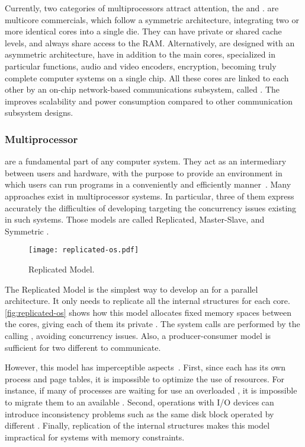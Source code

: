 			Currently, two categories of multiprocessors attract attention, the \cmp and \mpsoc.
			\cmps are multicore commercials, which follow a symmetric architecture,
			integrating two or more identical cores into a single die.
			They can have private or shared cache levels, and always share access
			to the RAM.
			Alternatively, \mpsocs are designed with an asymmetric architecture,
			have in addition to the main cores, specialized \cpus in particular
			functions, \eg audio and video encoders, encryption, becoming truly
			complete computer systems on a single chip.
			All these cores are linked to each other by an on-chip network-based
			communications subsystem, called \noc.
			The \noc improves scalability and power consumption compared to other
			communication subsystem designs.

		\subsubsection{Multiprocessor \oss}
		\label{sec.multiprocessor-os}

			\oss are a fundamental part of any computer system.
			They act as an intermediary between users and hardware, with the
			purpose to provide an environment in which users can run programs
			in a conveniently and efficiently manner~\cite{Silberschatz:9ed}.
			Many \os approaches exist in multiprocessor systems.
			In particular, three of them express accurately the difficulties
			of developing \oss targeting the concurrency issues existing in
			such systems.
			Those models are called Replicated, Master-Slave, and Symmetric \os.

			\begin{figure}[t]
				\centering%
				\caption{Replicated \os Model.}%
				\label{fig:replicated-os}%
				\texttt{[image: replicated-os.pdf]}%
			\end{figure}

			The Replicated Model is the simplest way to develop an \os for a
			parallel architecture.
			It only needs to replicate all the internal \os structures for each core.
			\autoref{fig:replicated-os} shows how this model allocates fixed memory spaces
			between the cores, giving each of them its private \os.
			The system calls are performed by the calling \cpu, avoiding concurrency issues.
			Also, a producer-consumer model is sufficient for two different \cpus to communicate.

			However, this model has imperceptible aspects~\cite{tanenbaum:4ed}.
			First, since each \cpu has its own process and page tables, it is impossible
			to optimize the use of resources.
			For instance, if many of processes are waiting for use an overloaded \cpu,
			it is impossible to migrate them to an available \cpu.
			Second, operations with I/O devices can introduce inconsistency problems
			such as the same disk block operated by different \cpus.
			Finally, replication of the internal \os structures makes this model
			impractical for systems with memory constraints.


